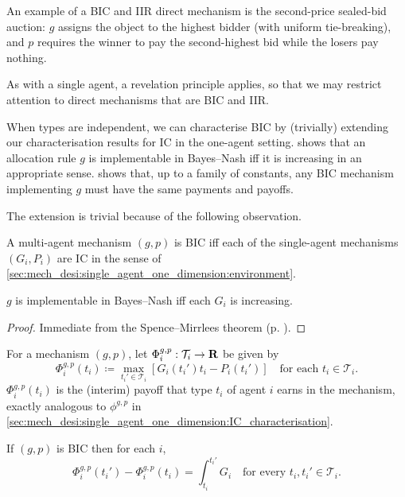 \documentclass[11pt,letterpaper,reqno,oneside]{article}
\begin{document}
An example of a BIC and IIR direct mechanism is the second-price sealed-bid auction: $g$ assigns the object to the highest bidder (with uniform tie-breaking), and $p$ requires the winner to pay the second-highest bid while the losers pay nothing.

As with a single agent, a revelation principle applies, so that we may restrict attention to direct mechanisms that are BIC and IIR.

When types are independent, we can characterise BIC by (trivially) extending our characterisation results for IC in the one-agent setting.  shows that an allocation rule $g$ is implementable in Bayes--Nash iff it is increasing in an appropriate sense.  shows that, up to a family of constants, any BIC mechanism implementing $g$ must have the same payments and payoffs.

The extension is trivial because of the following observation.
%
\begin{observation}
	A multi-agent mechanism $(g,p)$ is BIC iff each of the single-agent mechanisms $(G_i,P_i)$ are IC in the sense of \cref{sec:mech_desi:single_agent_one_dimension:environment}.
\end{observation}


\begin{corollary}
	\label{corollary:implementable_monotone_1d_BIC}
	$g$ is implementable in Bayes--Nash iff each $G_i$ is increasing.
\end{corollary}

\begin{proof}
	Immediate from the Spence--Mirrlees theorem (p. \pageref{theorem:implementable_monotone_1d}).
\end{proof}


For a mechanism $(g,p)$, let $\Phi^{g,p}_i : \mathcal{T}_i \to \mathbf{R}$ be given by
%
\begin{equation*}
	\Phi^{g,p}_i(t_i) \coloneqq \max_{t_i' \in \mathcal{T}_i} 
	\left[ G_i(t_i') t_i - P_i(t_i') \right]
	\quad \text{for each $t_i \in \mathcal{T}_i$} .
\end{equation*}
%
$\Phi^{g,p}_i(t_i)$ is the (interim) payoff that type $t_i$ of agent $i$ earns in the mechanism, exactly analogous to $\phi^{g,p}$ in \cref{sec:mech_desi:single_agent_one_dimension:IC_characterisation}.

\begin{corollary}
	\label{corollary:IC_envelope_1d_BIC}
	If $(g,p)$ is BIC then for each $i$,
	\begin{equation*}
		\Phi^{g,p}_i(t_i') - \Phi^{g,p}_i(t_i) 
		= \int_{t_i}^{t_i'} G_i
		\quad\text{for every $t_i,t_i' \in \mathcal{T}_i$} .
	\end{equation*}
\end{corollary}
\end{document}
